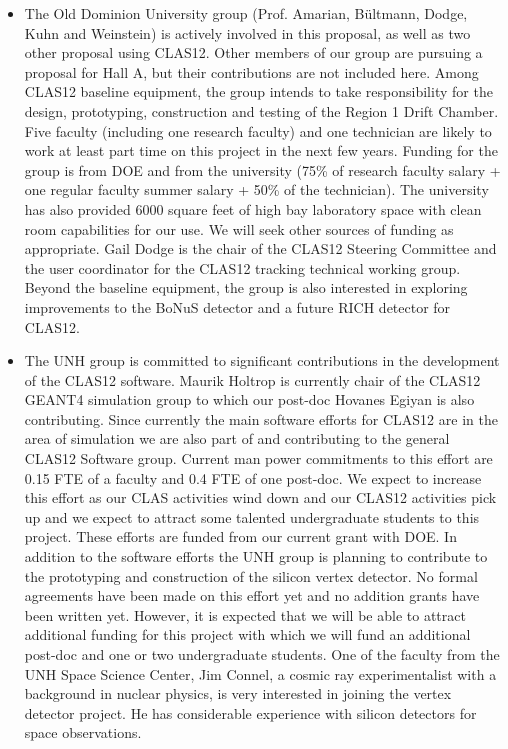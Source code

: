 \documentclass[12pt]{article}
\begin{document}
\begin{itemize}

\item
The Old Dominion University group (Prof. Amarian, B\"ultmann, Dodge, Kuhn and Weinstein)
is actively involved in
this proposal, as well as two other proposal using CLAS12.  Other  members of
our group are pursuing a proposal for Hall A, but their contributions  are not included here.
Among CLAS12 baseline equipment, the group intends to
take responsibility for the design, prototyping, construction and  testing
of the Region 1 Drift Chamber. Five faculty (including one research  faculty)
and one technician are likely to work at least part time on this
project in the next few years. Funding for the group is from DOE and  from
the university (75\% of research faculty salary + one regular faculty  summer salary
+ 50\% of the technician).
The university has also provided 6000 square feet of high bay  laboratory space with
clean room capabilities for our use.  We will seek other sources of  funding as appropriate.
Gail Dodge is the chair of the CLAS12 Steering Committee and the user  coordinator
for the CLAS12 tracking technical working group.
Beyond the baseline equipment, the group is also
interested in exploring improvements to the BoNuS detector and
a future RICH detector for CLAS12. 

\item
The UNH group is committed to significant contributions in the  development of the CLAS12 software. 
Maurik Holtrop is currently chair  of the CLAS12 GEANT4 simulation group to which our post-doc 
Hovanes  Egiyan is also contributing. Since currently the main software  efforts for CLAS12 are in
 the area of simulation we are also part of  and contributing to the general CLAS12 Software group. 
 Current man  power commitments to this effort are 0.15 FTE of a faculty and 0.4  FTE of one post-doc. 
 We expect to increase this effort as our CLAS  activities wind down and our CLAS12 activities pick up 
 and we expect  to attract some talented undergraduate students to this project.  
 These efforts are funded from our current grant with DOE.
In addition to the software efforts the UNH group is planning to  contribute to the prototyping and 
 construction of the silicon vertex  detector. No formal agreements have been made on this effort yet 
 and  no addition grants have been written yet. However, it is expected  that we will be able to attract 
 additional funding for this project  with which we will fund an additional post-doc and one or two  
 undergraduate students. One of the faculty from the UNH Space Science  Center, Jim Connel, 
 a cosmic ray experimentalist with a background in  nuclear physics, is very interested in joining 
 the vertex detector  project. He has considerable experience with silicon detectors for  space observations. 


\end{itemize}
\end{document}

